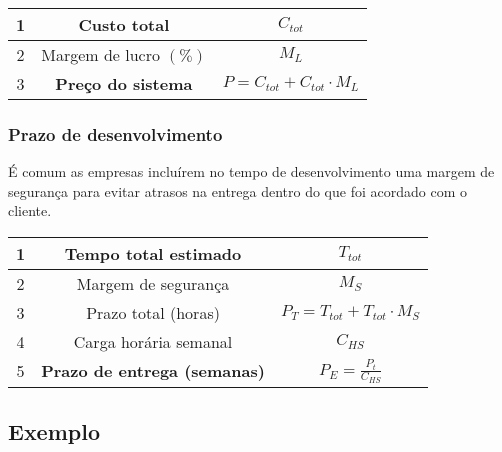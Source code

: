                 \begin{center}
                    
                    \begin{tabular}{| c | c | c |} \hline
                         1 & Custo total & $C_{tot}$  \\ \hline
                         2 & Margem de lucro $(\%)$ & $M_{L}$ \\ \hline 
                         3 & \textbf{Preço do sistema} & $P = C_{tot} + C_{tot} \cdot M_L$ \\ \hline
                    \end{tabular}
                    
                \end{center}
                
            \subsubsection*{Prazo de desenvolvimento}
            
                \noindent É comum as empresas incluírem no tempo de desenvolvimento uma margem de segurança para evitar atrasos na entrega dentro do que foi acordado com o cliente. 

                \begin{center}
                    
                    \begin{tabular}{| c | c | c |} \hline
                         1 & Tempo total estimado  & $T_{tot}$ \\ \hline
                         2 & Margem de segurança   & $M_S$ \\ \hline
                         3 & Prazo total (horas)   & $P_T = T_{tot} + T_{tot} \cdot M_S$ \\ \hline
                         4 & Carga horária semanal & $C_{HS}$ \\ \hline  
                         5 & \textbf{Prazo de entrega (semanas)} & $P_E = \frac{P_t}{C_{HS}}$ \\ \hline
                    \end{tabular}
                    
                \end{center}
            
        \subsection*{Exemplo}
        
